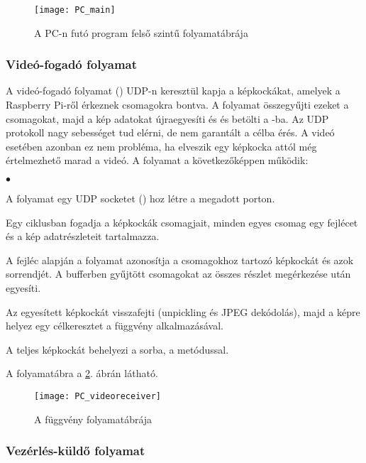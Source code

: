 \begin{figure}[h!]
	\centering
	\texttt{[image: PC\_main]}
	\caption{A PC-n futó program felső szintű folyamatábrája}
	\label{fig:PC_main}
\end{figure}

\subsubsection*{Videó-fogadó folyamat}

A videó-fogadó folyamat () UDP-n keresztül kapja a képkockákat, amelyek a Raspberry Pi-ről érkeznek csomagokra bontva. A folyamat összegyűjti ezeket a csomagokat, majd a kép adatokat újraegyesíti és és betölti a -ba. Az UDP protokoll nagy sebességet tud elérni, de nem garantált a célba érés. A videó esetében azonban ez nem probléma, ha elveszik egy képkocka attól még értelmezhető marad a videó. A folyamat a következőképpen működik:

\begin{list}{$\bullet$}{}
	\item A folyamat egy UDP socketet () hoz létre a megadott porton.
	\item Egy ciklusban fogadja a képkockák csomagjait, minden egyes csomag egy fejlécet és a kép adatrészleteit tartalmazza.
	\item A fejléc alapján a folyamat azonosítja a csomagokhoz tartozó képkockát és azok sorrendjét. A bufferben gyűjtött csomagokat az összes részlet megérkezése után egyesíti.
	\item Az egyesített képkockát visszafejti (unpickling és JPEG dekódolás), majd a képre helyez egy célkeresztet a  függvény alkalmazásával.
	\item A teljes képkockát behelyezi a  sorba, a  metódussal.
\end{list}

A folyamatábra a \ref{fig:PC_videoreceiver}. ábrán látható.

\begin{figure}[h!]
	\centering
	\texttt{[image: PC\_videoreceiver]}
	\caption{A  függvény folyamatábrája}
	\label{fig:PC_videoreceiver}
\end{figure}

\subsubsection*{Vezérlés-küldő folyamat}

